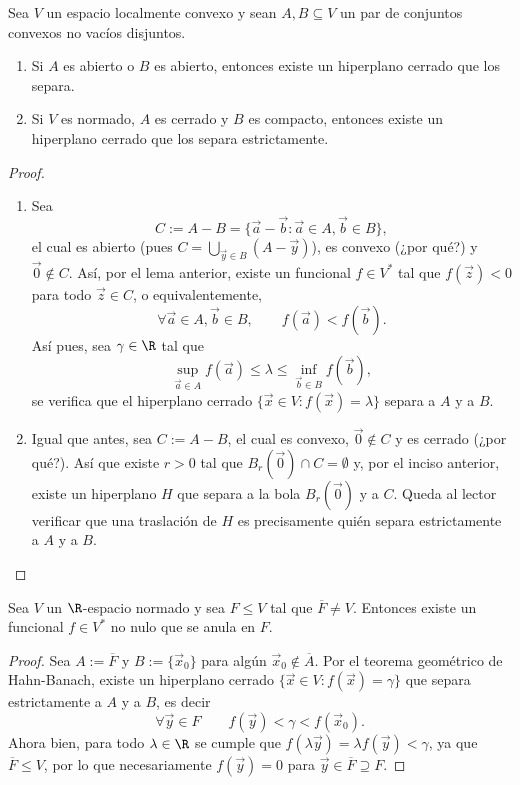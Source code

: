 \documentclass[topologia-analisis.tex]{subfiles}
\begin{document}
\begin{thmi}
	Sea $V$ un espacio localmente convexo y sean $A, B \subseteq V$ un par de conjuntos convexos no vacíos disjuntos.
	\begin{enumerate}
		\item Si $A$ es abierto o $B$ es abierto, entonces existe un hiperplano cerrado que los separa.
		\item Si $V$ es normado, $A$ es cerrado y $B$ es compacto, entonces existe un hiperplano cerrado que los separa estrictamente.
	\end{enumerate}
\end{thmi}
\begin{proof}
	\begin{enumerate}
		\item Sea
			\[
				C := A - B = \{ \vec a - \vec b : \vec a \in A, \vec b \in B \},
			\]
			el cual es abierto (pues $C = \bigcup_{\vec y \in B} (A - \vec y)$), es convexo (¿por qué?) y $\Vec 0 \notin C$.
			Así, por el lema anterior, existe un funcional $f \in V^*$ tal que $f(\vec z) < 0$ para todo $\vec z \in C$, o equivalentemente,
			\[
				\forall \vec a\in A, \vec b \in B, \qquad f(\vec a) < f(\vec b).
			\]
			Así pues, sea $\gamma \in \R$ tal que
			\[
				\sup_{\vec a \in A} f(\vec a) \le \lambda \le \inf_{\vec b \in B} f(\vec b),
			\]
			se verifica que el hiperplano cerrado $\{ \vec x \in V : f(\vec x) = \lambda \}$ separa a $A$ y a $B$.
		\item Igual que antes, sea $C := A - B$, el cual es convexo, $\Vec 0 \notin C$ y es cerrado (¿por qué?).
			Así que existe $r > 0$ tal que $B_r(\Vec 0) \cap C = \emptyset$ y, por el inciso anterior, existe un hiperplano $H$
			que separa a la bola $B_r(\Vec 0)$ y a $C$.
			Queda al lector verificar que una traslación de $H$ es precisamente quién separa estrictamente a $A$ y a $B$. \qedhere
	\end{enumerate}
\end{proof}
\begin{cor}
	Sea $V$ un $\R$-espacio normado y sea $F \le V$ tal que $\overline{F} \ne V$.
	Entonces existe un funcional $f \in V^*$ no nulo que se anula en $F$.
\end{cor}
\begin{proof}
	Sea $A := \overline{F}$ y $B := \{ \vec x_0 \}$ para algún $\vec x_0 \notin \overline{A}$.
	Por el teorema geométrico de Hahn-Banach, existe un hiperplano cerrado $\{ \vec x \in V : f(\vec x) = \gamma \}$
	que separa estrictamente a $A$ y a $B$, es decir
	\[
		\forall \vec y \in F \qquad f(\vec y) < \gamma < f(\vec x_0).
	\]
	Ahora bien, para todo $\lambda \in \R$ se cumple que $f(\lambda\vec y) = \lambda f(\vec y) < \gamma$,
	ya que $\overline{F} \le V$, por lo que necesariamente $f(\vec y) = 0$ para $\vec y \in \overline{F} \supseteq F$.
\end{proof}
\end{document}
